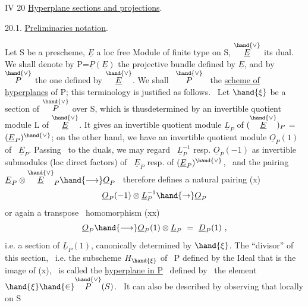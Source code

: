 IV 20 \quad \uline{Hyperplane sections and  projections}.

20.1. \quad \uline{Preliminaries  notation}.

Let S be a \quad prescheme, $\underline{E}$ a loc free Module of finite type on S,
$\overset{\hand{\vee}}{\underline{E}}$ its dual. We shall denote by P=$\underline{P}(\underline{E})$ the projective bundle defined by $\underline{E}$,
and by $\overset{\hand{\vee}}{P}$ the one defined by $\overset{\hand{\vee}}{\underline{E}}$. We shall  \ $\overset{\hand{\vee}}{P}$ \ the \uline{scheme of hyperplanes}
of P; this terminology is justified as follows. \ Let
$\hand{\xi}$ be a section of $\overset{\hand{\vee}}{P}$ over S, which is thus\hand{/}determined by an invertible
quotient module L of $\overset{\hand{\vee}}{\underline{E}}$. It gives an invertible quotient module
$\underline{L}_P$ of $(\overset{\hand{\vee}}{\underline{E}})_P$ = $(\underline{E}_P)^{\hand{\vee}}$; on the other hand, we have an invertible quotient module
$\underline{O}_P(1)$ of \ $\underline{E}_P$. Passing \ to the duals, we may regard \ $\underline{L}_P^{-1}$ resp. $\underline{O}_P(-1)$
as invertible submodules (loc direct factors) of \ $\underline{E}_P$ resp.
of $(\underline{E}_P)^{\hand{\vee}}$, \ and the pairing \ $\underline{E}_P \otimes \overset{\hand{\vee}}{\underline{E}}_P \hand{\longrightarrow} \underline{O}_P$ \ therefore defines a
natural pairing
(x) \[ \underline{O}_P(-1)\otimes\underline{L}_P^{-1} \hand{\to} \underline{O}_P \]
or again a transpose \ homomorphism
(xx) \[ \underline{O}_P \hand{\longrightarrow} \underline{O}_P(1)\otimes\underline{L}_P \ = \ \underline{D}_P(1) \ , \]
i.e. a section of $\underline{L}_P(1)$, canonically determined by $\hand{\xi}$. The ``divisor''
of this section, \ i.e. the  subscheme $H_{\hand{\xi}}$ of \ P defined by the Ideal
that is the image of (x), \ is called the \uline{hyperplane in P} \ defined by \ the element
$\hand{\xi} \hand{\in} \overset{\hand{\vee}}{P}(S)$. \ It can also be described by observing that locally on S 
